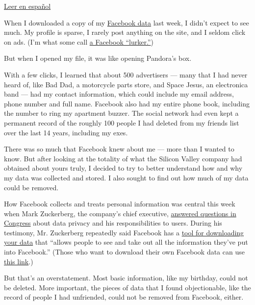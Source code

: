 \href{https://www.nytimes3xbfgragh.onion/es/2018/04/12/facebook-index-informacion/}{Leer
en español}

When I downloaded a copy of my
\href{https://www.nytimes3xbfgragh.onion/2019/03/13/technology/facebook-data-subpoenas.html}{Facebook
data} last week, I didn't expect to see much. My profile is sparse, I
rarely post anything on the site, and I seldom click on ads. (I'm what
some call
\href{https://www.urbandictionary.com/define.php?term=Facebook\%20lurker}{a
Facebook ``lurker.''})

But when I opened my file, it was like opening Pandora's box.

With a few clicks, I learned that about 500 advertisers --- many that I
had never heard of, like Bad Dad, a motorcycle parts store, and Space
Jesus, an electronica band --- had my contact information, which could
include my email address, phone number and full name. Facebook also had
my entire phone book, including the number to ring my apartment buzzer.
The social network had even kept a permanent record of the roughly 100
people I had deleted from my friends list over the last 14 years,
including my exes.

There was so much that Facebook knew about me --- more than I wanted to
know. But after looking at the totality of what the Silicon Valley
company had obtained about yours truly, I decided to try to better
understand how and why my data was collected and stored. I also sought
to find out how much of my data could be removed.

How Facebook collects and treats personal information was central this
week when Mark Zuckerberg, the company's chief executive,
\href{https://www.nytimes3xbfgragh.onion/2018/04/10/us/politics/mark-zuckerberg-testimony.html}{answered
questions in Congress} about data privacy and his responsibilities to
users. During his testimony, Mr. Zuckerberg repeatedly said Facebook has
a \href{https://www.facebookcorewwwi.onion/help/131112897028467}{tool
for downloading your data} that ``allows people to see and take out all
the information they've put into Facebook.'' (Those who want to download
their own Facebook data can use
\href{https://www.facebookcorewwwi.onion/help/131112897028467}{this
link}.)

But that's an overstatement. Most basic information, like my birthday,
could not be deleted. More important, the pieces of data that I found
objectionable, like the record of people I had unfriended, could not be
removed from Facebook, either.

